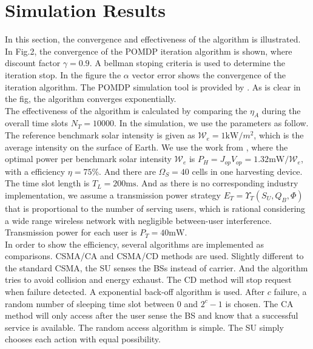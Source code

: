 \documentclass[conference]{IEEEtran}
\begin{document}
\section{Simulation Results}
In this section, the convergence and effectiveness of the algorithm is illustrated.
In Fig.2, the convergence of the POMDP iteration algorithm is shown, where discount factor \(\gamma = 0.9\).
A bellman stoping criteria is used to determine the iteration stop.
In the figure the \(\alpha\) vector error shows the convergence of the iteration algorithm.
The POMDP simulation tool is provided by \cite{pomdptool}. 
As is clear in the fig, the algorithm converges exponentially.\\
\indent The effectiveness of the algorithm is calculated by comparing the \(\eta_A\)
during the overall time slots \(N_T = 10000\).
In the simulation, we use the parameters as follow.
The reference benchmark solar intensity is given as \(\mathcal{W}_e = 1\mbox{kW}/m^2\),
which is the average intensity on the surface of Earth\cite{electric}.
We use the work from \cite{circuit}, where the optimal power per benchmark solar intensity \(\mathcal{W}_e\)
is \(P_H = J_{op}V_{op} = 1.32\mbox{mW}/\mathcal{W}_e\), with a efficiency \(\eta = 75 \%\).
And there are \(\Omega_S = 40\) cells in one harvesting device.
The time slot length is \(T_L = 200\mbox{ms}\).
And as there is no corresponding industry implementation,
we assume a transmission power strategy \(E_T = \Upsilon_T(S_U, Q_B, \Phi)\)
that is proportional to the number of serving users,
which is rational considering a wide range wireless network with negligible between-user interference.
Transmission power for each user is \(P_T = 40\mbox{mW}\).\\
\indent In order to show the efficiency, several algorithms are implemented as comparisons.
CSMA/CA and CSMA/CD methods are used. 
Slightly different to the standard CSMA, the SU senses the BSs instead of carrier. 
And the algorithm tries to avoid collision and energy exhaust.
The CD method will stop request when failure detected. A exponential back-off algorithm is used.
After \(c\) failure, a random number of sleeping time slot between \(0\) and \(2^c - 1\) is chosen.
The CA method will only access after the user sense the BS and know that a successful service is available.
The random access algorithm is simple. The SU simply chooses each action with equal possibility.\\
\end{document}
